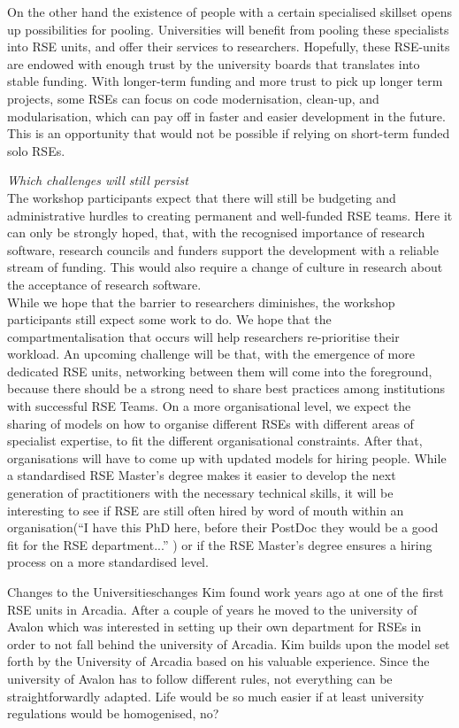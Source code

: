 \documentclass{eceasst}
\begin{document}
On the other hand the existence of people with a certain specialised skillset opens up possibilities for pooling.
Universities will benefit from pooling these specialists into RSE units, and offer their services to researchers.
Hopefully, these RSE-units are endowed with enough trust by the university boards that translates into stable funding.
With longer-term funding and more trust to pick up longer term projects,
some RSEs can focus on code modernisation, clean-up, and modularisation,
which can pay off in faster and easier development in the future.
This is an opportunity that would not be possible if relying on short-term funded solo RSEs.

\emph{Which challenges will still persist}\\
The workshop participants expect that there will still be budgeting and administrative hurdles to creating
permanent and well-funded RSE teams.
Here it can only be strongly hoped, that, with the recognised importance of research software, research councils and funders
support the development with a reliable stream of funding.
This would also require a change of culture in research about the acceptance of research software.\\
While we hope that the barrier to researchers diminishes, the workshop participants
still expect some work to do. We hope that the compartmentalisation that occurs will help researchers re-prioritise their workload.
An upcoming challenge will be that, with the emergence of more dedicated RSE units,
networking between them will come into the foreground, because there should be a strong need to share best practices
among institutions with successful RSE Teams.
On a more organisational level, we expect the sharing of models on how to organise different RSEs with different areas of specialist expertise, to fit the different organisational constraints.
After that, organisations will have to come up with updated models for hiring people.
While a standardised RSE Master's degree makes it easier to develop the next generation of practitioners with the necessary technical skills, it will be interesting to see if
RSE are still often hired by word of mouth within an organisation(``I have this PhD here, before their PostDoc they would be a good fit for the RSE department...'' ) or if the RSE Master's degree ensures a hiring process on a more standardised level.

\begin{story}{Changes to the Universities}{changes}
Kim found work years ago at one of the first RSE units in Arcadia. After a couple of years he moved to the university of
Avalon which was interested in setting up their own department for RSEs in order to not fall behind the university of Arcadia.
Kim builds upon the model set forth by the University of Arcadia based on his valuable experience. Since the university
of Avalon has to follow different rules, not everything can be straightforwardly adapted. Life would be so much easier
if at least university regulations would be homogenised, no?
\end{story}
\end{document}
